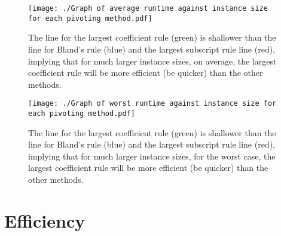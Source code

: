 \documentclass[a4paper]{article}
\numberwithin{equation}{section}
\begin{document}
\begin{figure}[h!]
  \begin{center}
    \texttt{[image: ./Graph of average runtime against instance size for each pivoting method.pdf]}
  \end{center}
  \caption{The line for the largest coefficient rule (green) is shallower than the line for Bland's rule (blue) and the largest subscript rule line (red), implying that for much larger instance sizes, on average, the largest coefficient rule will be more efficient (be quicker) than the other methods.
  }
  \label{fig:a_figure}
\end{figure}

\begin{figure}[h!]
  \begin{center}
    \texttt{[image: ./Graph of worst runtime against instance size for each pivoting method.pdf]}
  \end{center}
  \caption{The line for the largest coefficient rule (green) is shallower than the line for Bland's rule (blue) and the largest subscript rule line (red), implying that for much larger instance sizes, for the worst case, the largest coefficient rule will be more efficient (be quicker) than the other methods.
  }
  \label{fig:a_figure}
\end{figure}

\section{Efficiency}
\label{sec:efficiency}
\end{document}
